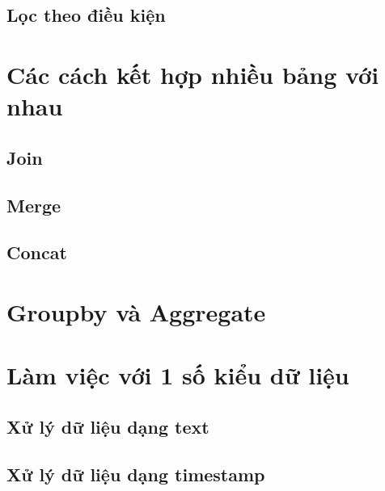 \documentclass[
]{book}
\begin{document}
\hypertarget{lux1ecdc-theo-ux111iux1ec1u-kiux1ec7n}{%
\section{Lọc theo điều kiện}\label{lux1ecdc-theo-ux111iux1ec1u-kiux1ec7n}}

\hypertarget{cuxe1c-cuxe1ch-kux1ebft-hux1ee3p-nhiux1ec1u-bux1ea3ng-vux1edbi-nhau}{%
\chapter{Các cách kết hợp nhiều bảng với nhau}\label{cuxe1c-cuxe1ch-kux1ebft-hux1ee3p-nhiux1ec1u-bux1ea3ng-vux1edbi-nhau}}

\hypertarget{join}{%
\section{Join}\label{join}}

\hypertarget{merge}{%
\section{Merge}\label{merge}}

\hypertarget{concat}{%
\section{Concat}\label{concat}}

\hypertarget{groupby-vuxe0-aggregate}{%
\chapter{Groupby và Aggregate}\label{groupby-vuxe0-aggregate}}

\hypertarget{luxe0m-viux1ec7c-vux1edbi-1-sux1ed1-kiux1ec3u-dux1eef-liux1ec7u}{%
\chapter{Làm việc với 1 số kiểu dữ liệu}\label{luxe0m-viux1ec7c-vux1edbi-1-sux1ed1-kiux1ec3u-dux1eef-liux1ec7u}}

\hypertarget{xux1eed-luxfd-dux1eef-liux1ec7u-dux1ea1ng-text}{%
\section{Xử lý dữ liệu dạng text}\label{xux1eed-luxfd-dux1eef-liux1ec7u-dux1ea1ng-text}}

\hypertarget{xux1eed-luxfd-dux1eef-liux1ec7u-dux1ea1ng-timestamp}{%
\section{Xử lý dữ liệu dạng timestamp}\label{xux1eed-luxfd-dux1eef-liux1ec7u-dux1ea1ng-timestamp}}
\end{document}
